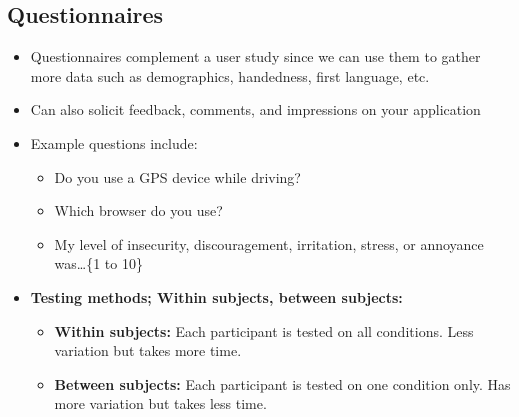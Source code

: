 \documentclass[12pt]{book}
\begin{document}
\subsection*{Questionnaires}
\begin{itemize}
  \item Questionnaires complement a user study since we can use them to gather more data such as demographics, handedness, first language, etc.
  \item Can also solicit feedback, comments, and impressions on your application
  \item Example questions include:
  \begin{itemize}
    \item Do you use a GPS device while driving?
    \item Which browser do you use?
    \item My level of insecurity, discouragement, irritation, stress, or annoyance was\ldots\{1 to 10\}
  \end{itemize}

  \item \textbf{Testing methods; Within subjects, between subjects:}
  \begin{itemize}
    \item \textbf{Within subjects:} Each participant is tested on all conditions. Less variation but takes more time.
    \item \textbf{Between subjects:} Each participant is tested on one condition only. Has more variation but takes less time.
  \end{itemize} 
\end{itemize}
\end{document}
